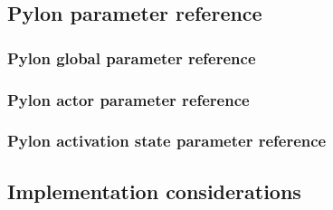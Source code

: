 \documentclass[12pt]{article}
\begin{document}






\subsection{Pylon parameter reference}

\subsubsection{Pylon global parameter reference}



\subsubsection{Pylon actor parameter reference}

\subsubsection{Pylon activation state parameter reference}
\label{state_reference}









\subsection{Implementation considerations}
\end{document}
